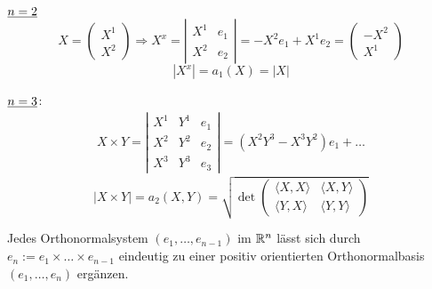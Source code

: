 \begin{bsp}{\(\uline{n=2}\)}
 \[ X=\begin{pmatrix}
       X^1 \\
       X^2
      \end{pmatrix}
      \Rightarrow X^x = \left\vert \begin{matrix}
                                    X^1 & e_1 \\
                                    X^2 & e_2
                                   \end{matrix}
			\right\vert
			= -X^2 e_1 + X^1 e_2 = \begin{pmatrix}
			                        -X^2 \\
			                        X^1
			                       \end{pmatrix}
\]
\[
 |X^x| = a_1(X) = |X|
\]
\end{bsp}

\begin{bsp}{\(\uline{n=3}\):}
  \begin{align*}
   X \times Y = \left\vert \begin{matrix}
                            X^1 & Y^1 & e_1 \\
                            X^2 & Y^2 & e_2 \\
                            X^3 & Y^3 & e_3
                           \end{matrix}
		\right\vert
		=(X^2Y^3-X^3Y^2) e_1 + \dots
  \end{align*}
\[
 |X \times Y| = a_2(X,Y) = \sqrt{\det \begin{pmatrix}
                                      \langle X,X\rangle & \langle X,Y\rangle \\
                                      \langle Y,X \rangle & \langle Y,Y\rangle
                                     \end{pmatrix}
}
\]
\end{bsp}

\begin{anwendung} 
Jedes Orthonormalsystem \((e_1, \dots, e_{n-1})\) im \(\mathbb{R}^n\) lässt sich durch \(e_n := e_1 \times \dots \times e_{n-1}\) eindeutig zu einer positiv orientierten Orthonormalbasis \((e_1, \dots, e_n)\) ergänzen.
\end{anwendung}
